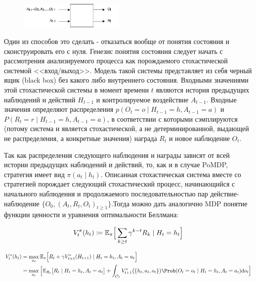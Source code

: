 \documentclass[../main.tex]{subfiles}
\begin{document}
\begin{figure}
	\vspace{-0.5cm}
	\centering
	\includegraphics[width=0.45\textwidth]{Images/IO_system.drawio.png}
\end{figure}

Один из способов это сделать - отказаться вообще от понятия  состояния и сконструировать его с нуля. Генезис понятия состояния следует начать с рассмотрения анализируемого процесса как порождаемого стохастической системой <<вход/выход>>.  Модель такой системы представляет из себя черный ящик (black box) без какого либо внутреннего состояния.  
Входными значениями этой стохастической системы  в  момент времени $t$   являются история предыдущих наблюдений и  действий $H_{t-1}$ и контролируемое воздействие $A_{t-1}$.  Входные значения определяют распределения ${p(O_t=o \mid H_{t-1}=h, A_{t-1}=a)}$ и 
${P(R_t=r \mid H_{t-1}=h, A_{t-1}=a)}$, в соответствии с которыми сэмплируются (потому система и является стохастической, а не детерминированной, выдающей не распределения, а конкретные значения) награда $R_t$ и новое наблюдение $O_t$.


 Так как распределения следующего наблюдения и награды зависят от всей истории предыдущих наблюдений и действий, то, как и в случае PoMDP, стратегия имеет вид $\pi(a_t \mid h_t)$. Описанная стохастическая система вместе со стратегией порождает следующий стохастический процесс, начинающийся с начального наблюдения и продолжаемого последовательностью пар действие-наблюдение $\{O_0, (A_t, R_t, O_t)_{t \geq 1}\}$.Тогда можно дать аналогично MDP понятие функции ценности и уравнения оптимальности Беллмана:

\begin{equation}
V_t^\pi(h_t) \coloneqq \mathbb{E}_\pi \Big[\sum_{k \ge t} \gamma^{k-t} R_k \mid H_t=h_t \Big] 
\end{equation}

\begin{align*}
 V_t^*(h_t) &= \max_{a_t} \E_\pi \Big[R_t + \gamma V_{t+1}^*(H_{t+1})  \mid H_t=h_t, A_t=a_t \Big] \\
  &= \max_{a_t} \Big[
   \E_{R_t}\big[R_t \mid H_t=h_t, A_t=a_t\big] + \int_{\mathcal{O}_t} V_{t+1}^* \big(\{h_t, a_t, o_t\}\big) \Prob(O_t=o_t \mid H_t=h_t, A_t=a_t) \mathrm{d}o_t
	\Big]
\end{align*}
\end{document}
